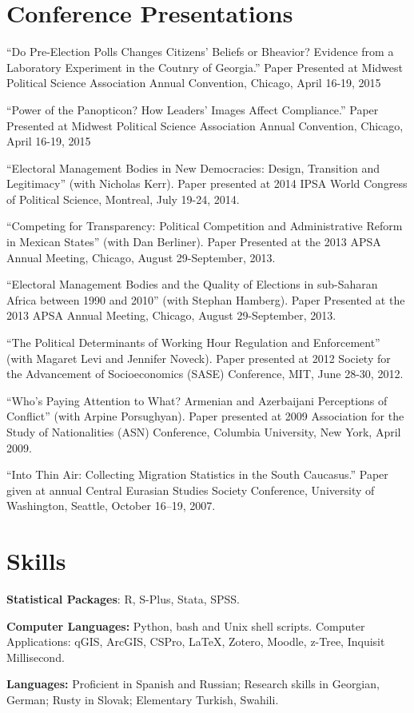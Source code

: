 \documentclass[margin,line]{res}
\begin{document}
{\begin{resume}
\section{\sc Conference Presentations}

``Do Pre-Election Polls Changes Citizens' Beliefs or Bheavior?
Evidence from a Laboratory Experiment in the Coutnry of Georgia.''
Paper Presented at Midwest Political Science Association Annual
Convention, Chicago, April 16-19, 2015

``Power of the Panopticon? How Leaders’ Images Affect Compliance.''
Paper Presented at Midwest Political Science Association Annual
Convention, Chicago, April 16-19, 2015

``Electoral Management Bodies in New Democracies:
Design, Transition and Legitimacy'' (with Nicholas Kerr). Paper
presented at 2014 IPSA World Congress of Political Science, Montreal, July 19-24, 2014. 

``Competing for Transparency: Political Competition and Administrative
Reform in Mexican States'' (with Dan Berliner). Paper Presented at
the 2013 APSA Annual Meeting, Chicago, August 29-September, 2013.

``Electoral Management Bodies and the Quality of Elections in
 sub-Saharan Africa between 1990 and 2010'' (with Stephan Hamberg).
Paper Presented at
the 2013 APSA Annual Meeting, Chicago, August 29-September, 2013.

 ``The Political Determinants of Working Hour Regulation and Enforcement'' (with Magaret Levi and Jennifer Noveck). Paper presented at 2012 Society for the Advancement of
Socioeconomics (SASE) Conference, MIT, June 28-30, 2012.

``Who's Paying Attention to What? Armenian
 and Azerbaijani Perceptions of Conflict''  (with Arpine Porsughyan). Paper presented at 2009
 Association for the Study of Nationalities (ASN) Conference, Columbia
 University, New York, April 2009.

``Into Thin Air: Collecting Migration Statistics in the South
Caucasus.'' Paper given at annual Central Eurasian Studies
Society Conference, University of Washington, Seattle, October 16--19, 2007.

\section{\sc Skills} 
\textbf{Statistical Packages}:  R, S-Plus, Stata, SPSS. \par\smallskip
\textbf{Computer Languages:} Python, bash and Unix shell scripts. 
Computer Applications: qGIS, ArcGIS, CSPro,  \LaTeX, Zotero, Moodle, z-Tree, Inquisit Millisecond.\par\smallskip
\textbf{Languages:} Proficient in Spanish and Russian; Research skills in
  Georgian, German; Rusty in Slovak; Elementary Turkish, Swahili.


\end{resume}}
\end{document}
